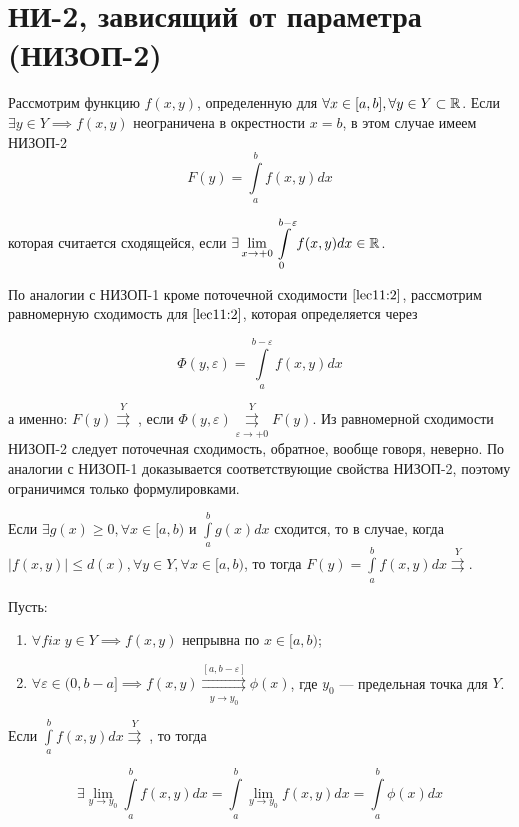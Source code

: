 \documentclass[../../main.tex]{subfiles}
\begin{document}
\section{НИ-2, зависящий от параметра (НИЗОП-2)}

	Рассмотрим функцию $f(x, y)$, определенную для $\forall x \in [a, b], \forall y \in Y \subset \mathbb{R}$. Если $\exists y \in Y \implies f(x, y)$ неограничена в окрестности $x = b$, в этом случае имеем НИЗОП-2 
	\begin{equation}\label{lec11:3}
		F(y) = \int\limits_a^b f(x, y) dx
	\end{equation}
	
	которая считается сходящейся, если $\displaystyle \exists \lim_{x \rightarrow +0} \int\limits_0^{b - \varepsilon} f(x, y) dx \in \mathbb{R}$.
	
	По аналогии с НИЗОП-1 кроме поточечной сходимости $\eqref{lec11:2}$, рассмотрим равномерную сходимость для $\eqref{lec11:2}$, которая определяется через 
	
	\begin{equation}\label{lec11:4}
		\Phi(y, \varepsilon) = \int\limits_a^{b - \varepsilon} f(x, y) dx
	\end{equation}
	
	а именно: $F(y) \overset{Y}\rightrightarrows\;$, если $\Phi(y, \varepsilon) \overset{Y}{\underset{\varepsilon \rightarrow +0}\rightrightarrows} F(y)$. Из равномерной сходимости НИЗОП-2 следует поточечная сходимость, обратное, вообще говоря, неверно. По аналогии с НИЗОП-1 доказывается соответствующие свойства НИЗОП-2, поэтому ограничимся только формулировками.
	
	\begin{thm}
		Если $\exists g(x) \geq 0, \forall x \in [a, b)$ и $\int\limits_a^b g(x) dx$ сходится, то в случае, когда $|f(x, y)| \leq d(x), \forall y \in Y, \forall x \in [a, b)$, то тогда $F(y) = \int\limits_a^b f(x, y) dx \overset{Y}{\rightrightarrows}$.
	\end{thm}
	
	\begin{thm}
		Пусть:
		
		\begin{enumerate}
			\item $\forall fix \; y \in Y \implies f(x, y)$ непрывна по $x \in [a, b)$;
			\item $\forall \varepsilon \in (0, b - a] \implies f(x, y) \overset{[a, b - \varepsilon]}{\underset{y \rightarrow y_0}\rightrightarrows} \phi(x)$, где $y_0$ --- предельная точка для $Y$.
		\end{enumerate}
		
		Если $\int\limits_a^b f(x, y) dx \overset{Y}\rightrightarrows \;$, то тогда 
		
		\begin{equation}\label{lec11:5}
			\exists \lim_{y \rightarrow y_0} \int\limits_a^b f(x, y) dx = \int\limits_a^b \lim_{y \rightarrow y_0} f(x, y) dx = \int\limits_a^b \phi(x) dx
		\end{equation}
	\end{thm}
\end{document}
